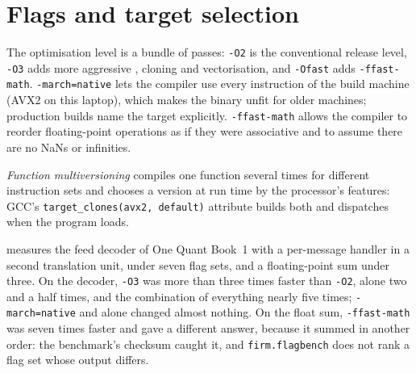 \section{Flags and target selection}

The optimisation level is a bundle of passes: \texttt{-O2} is the conventional release level, \texttt{-O3} adds more
aggressive , cloning and vectorisation, and \texttt{-Ofast} adds \texttt{-ffast-math}. \texttt{-march=native}
lets the compiler use every instruction of the build machine (AVX2 on this laptop), which makes the binary unfit for older
machines; production builds name the target explicitly. \texttt{-ffast-math} allows the compiler to reorder floating-point
operations as if they were associative and to assume there are no NaNs or infinities.

\begin{definition}\label{def:ll:cpp-for-latency-iii-the-compiler:fmv}
\emph{Function multiversioning} compiles one function several times for different
instruction sets and chooses a version at run time by the processor's features: GCC's \texttt{target\_clones(\textquotedbl{}avx2\textquotedbl{},
\textquotedbl{}default\textquotedbl{})} attribute builds both and dispatches when the program loads.
\end{definition}

 measures the feed decoder of One Quant Book~1 with a per-message
handler in a second translation unit, under seven flag sets, and a floating-point sum under three. On the decoder,
\texttt{-O3} was more than three times faster than \texttt{-O2},  alone two and a half times,
and the combination of everything nearly five times; \texttt{-march=native} and  alone changed almost
nothing. On the float sum, \texttt{-ffast-math} was seven times faster and gave a different answer, because it summed in
another order: the benchmark's checksum caught it, and \texttt{firm.flagbench} does not rank a flag set whose output
differs.

